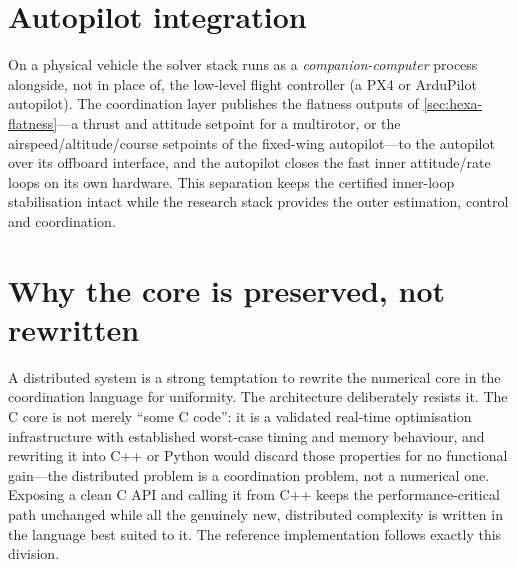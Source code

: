 \section{Autopilot integration}

On a physical vehicle the solver stack runs as a \emph{companion-computer}
process alongside, not in place of, the low-level flight controller (\eg a PX4 or
ArduPilot autopilot). The coordination layer publishes the flatness outputs of
\cref{sec:hexa-flatness}---a thrust and attitude setpoint for a multirotor, or
the airspeed/altitude/course setpoints of the fixed-wing autopilot---to the
autopilot over its offboard interface, and the autopilot closes the fast inner
attitude/rate loops on its own hardware. This separation keeps the certified
inner-loop stabilisation intact while the research stack provides the outer
estimation, control and coordination.

\section{Why the core is preserved, not rewritten}

A distributed system is a strong temptation to rewrite the numerical core in the
coordination language for uniformity. The architecture deliberately resists it.
The C core is not merely ``some C code'': it is a validated real-time optimisation
infrastructure with established worst-case timing and memory behaviour, and
rewriting it into C++ or Python would discard those properties for no functional
gain---the distributed problem is a coordination problem, not a numerical one.
Exposing a clean C API and calling it from C++ keeps the performance-critical
path unchanged while all the genuinely new, distributed complexity is written in
the language best suited to it. The reference implementation follows exactly this
division.
